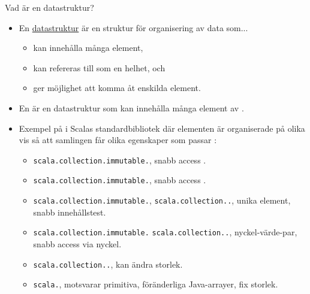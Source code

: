 
\ifkompendium\else

\begin{Slide}{Vad är en datastruktur?}\SlideFontSmall
\setlength{\leftmargini}{0pt}
\begin{itemize}
\item En \href{https://sv.wikipedia.org/wiki/Datastruktur}{datastruktur} är en struktur för organisering av data som...
\begin{itemize}\SlideFontTiny
\item kan innehålla många element,
\item kan refereras till som en helhet, och
\item ger möjlighet att komma åt enskilda element.
\end{itemize}

\item En   är en datastruktur som kan innehålla många element av .

\item Exempel på  i Scalas standardbibliotek där elementen är organiserade på olika vis så att samlingen får olika egenskaper som passar : 
\begin{itemize}\SlideFontTiny
\item \texttt{scala.collection.immutable.}, snabb access .
\item \texttt{scala.collection.immutable.}, snabb access .
\item \texttt{scala.collection.immutable.}, \texttt{scala.collection..}, unika element, snabb innehållstest.
\item \texttt{scala.collection.immutable.} \texttt{scala.collection..}, nyckel-värde-par, snabb access via nyckel.
\item \texttt{scala.collection..}, kan ändra storlek.
\item \texttt{scala.}, motsvarar primitiva, föränderliga Java-arrayer, fix storlek.
\end{itemize}

\end{itemize}

\end{Slide} 

